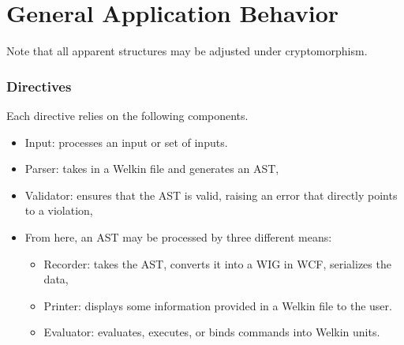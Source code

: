 

\section{General Application Behavior}

Note that all apparent structures may be adjusted under cryptomorphism.


\subsubsection*{Directives}
Each directive relies on the following components.
\begin{itemize}
  \item Input: processes an input or set of inputs.
  \item Parser: takes in a Welkin file and generates an AST,
  \item Validator: ensures that the AST is valid, raising an error that directly points to a violation,
  \item From here, an AST may be processed by three different means:
		\begin{itemize}
		  \item Recorder: takes the AST, converts it into a WIG in WCF, serializes the data,
		  \item Printer: displays some information provided in a Welkin file to the user.
		  \item Evaluator: evaluates, executes, or binds commands into Welkin units.
		\end{itemize}
\end{itemize}

